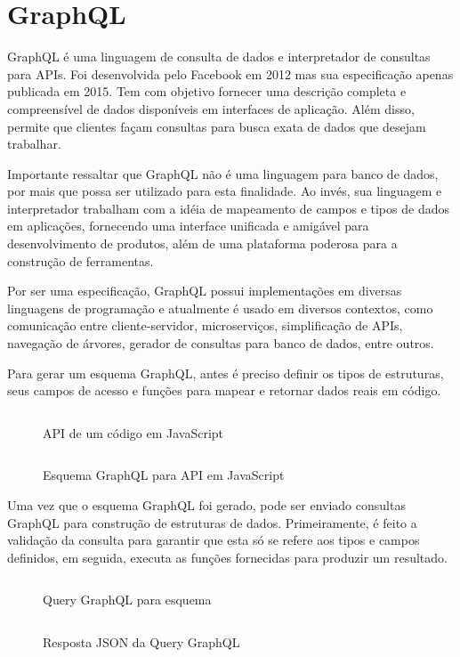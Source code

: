 \section{GraphQL}

GraphQL é uma linguagem de consulta de dados e interpretador de consultas para APIs. Foi desenvolvida pelo Facebook em 2012 mas sua especificação apenas publicada em 2015. Tem com objetivo fornecer uma descrição completa e compreensível de dados disponíveis em interfaces de aplicação. Além disso, permite que clientes façam consultas para busca exata de dados que desejam trabalhar. \cite{GraphQL2016}

Importante ressaltar que GraphQL não é uma linguagem para banco de dados, por mais que possa ser utilizado para esta finalidade. Ao invés, sua linguagem e interpretador trabalham com a idéia de mapeamento de campos e tipos de dados em aplicações, fornecendo uma interface unificada e amigável para desenvolvimento de produtos, além de uma plataforma poderosa para a construção de ferramentas. \cite{GraphQL2016}

Por ser uma especificação, GraphQL possui implementações em diversas linguagens de programação e atualmente é usado em diversos contextos, como comunicação entre cliente-servidor, microserviços, simplificação de APIs, navegação de árvores, gerador de consultas para banco de dados, entre outros.

Para gerar um esquema GraphQL, antes é preciso definir os tipos de estruturas, seus campos de acesso e funções para mapear e retornar dados reais em código.

\begin{figure}[H]
  \centering
  \inputminted[frame=single,framesep=10pt]{javascript}{anexos/pessoa.js}
  \caption{API de um código em JavaScript}
\end{figure}

\begin{figure}[H]
  \centering
  \inputminted[frame=single,framesep=10pt]{javascript}{anexos/pessoa-graphql-schema.graphql}
  \caption{Esquema GraphQL para API em JavaScript}
\end{figure}

Uma vez que o esquema GraphQL foi gerado, pode ser enviado consultas GraphQL para construção de estruturas de dados. Primeiramente, é feito a validação da consulta para garantir que esta só se refere aos tipos e campos definidos, em seguida, executa as funções fornecidas para produzir um resultado. \cite{GraphQL2016}

\begin{figure}[H]
  \centering
  \inputminted[frame=single,framesep=10pt]{javascript}{anexos/pessoa-graphql-query.graphql}
  \caption{Query GraphQL para esquema}
\end{figure}

\begin{figure}[H]
  \centering
  \inputminted[frame=single,framesep=10pt]{javascript}{anexos/pessoa-graphql-query-response.json}
  \caption{Resposta JSON da Query GraphQL}
\end{figure}




